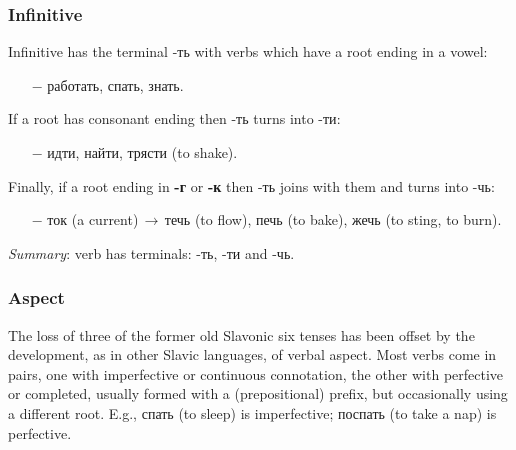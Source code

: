 \documentclass[12pt]{article}
\begin{document}
\subsubsection*{Infinitive}
Infinitive has the terminal \textcolor{dgreen}{-ть} with verbs which have a root ending in a vowel:  
\begin{itemize}
\vspace{-0.2cm}
\item[$-$]работ\textcolor{dgreen}{ать}, сп\textcolor{dgreen}{ать}, зн\textcolor{dgreen}{ать}.
\end{itemize}
If a root has consonant ending then \textcolor{dgreen}{-ть} turns into \textcolor{dgreen}{-ти}:
\begin{itemize}
\vspace{-0.2cm}
\item[$-$]ид\textcolor{dgreen}{ти}, най\textcolor{dgreen}{ти}, тряс\textcolor{dgreen}{ти} (to shake). 
\end{itemize}
Finally, if a root ending in \textbf{-г} or \textbf{-к} then \textcolor{dgreen}{-ть} joins with them and turns into \textcolor{dgreen}{-чь}: 
\begin{itemize}
\vspace{-0.2cm}
\item[$-$]то\textcolor{dgreen}{к} (a current)\,$ \rightarrow $\,те\textcolor{dgreen}{чь} (to flow), пе\textcolor{dgreen}{чь} (to bake), же\textcolor{dgreen}{чь} (to sting, to burn).
\end{itemize}
\textit{Summary}: verb has terminals: \textcolor{dgreen}{-ть}, \textcolor{dgreen}{-ти} and \textcolor{dgreen}{-чь}.
\subsubsection*{Aspect}
The loss of three of the former old Slavonic six tenses has been offset by the development, as in other Slavic languages, of verbal aspect. Most verbs come in pairs, one with imperfective or continuous connotation, the other with perfective or completed, usually formed with a (prepositional) prefix, but occasionally using a different root. E.g., спать (to sleep) is imperfective; поспать (to take a nap) is perfective.
\end{document}
